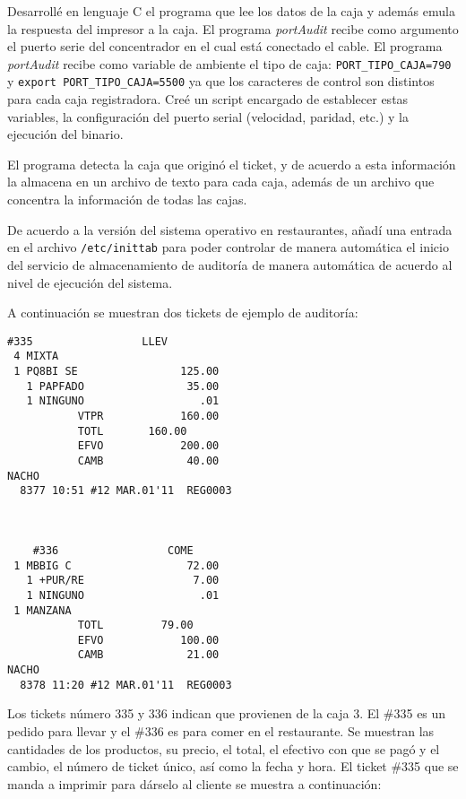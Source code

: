 Desarrollé en lenguaje C el programa que lee los datos de la caja y además emula la respuesta del impresor a la caja. El programa \textit{portAudit} recibe como argumento el puerto serie del concentrador en el cual está conectado el cable. El programa \textit{portAudit} recibe como variable de ambiente el tipo de caja: \texttt{PORT\_TIPO\_CAJA=790} y \texttt{export PORT\_TIPO\_CAJA=5500} ya que los caracteres de control son distintos para cada caja registradora. Creé un script encargado de establecer estas variables, la configuración del puerto serial (velocidad, paridad, etc.) y la ejecución del binario.

El programa detecta la caja que originó el ticket, y de acuerdo a esta información la almacena en un archivo de texto para cada caja, además de un archivo que concentra la información de todas las cajas.

De acuerdo a la versión del sistema operativo en restaurantes, añadí una entrada en el archivo \texttt{/etc/inittab} para poder controlar de manera automática el inicio del servicio de almacenamiento de auditoría de manera automática de acuerdo al nivel de ejecución del sistema. 

A continuación se muestran dos tickets de ejemplo de auditoría:

\begin{Verbatim}[fontsize=\small]
    #335                 LLEV  
 4 MIXTA   
 1 PQ8BI SE                125.00  
   1 PAPFADO                35.00  
   1 NINGUNO                  .01  
           VTPR            160.00  
           TOTL       160.00  
           EFVO            200.00  
           CAMB             40.00  
NACHO  
  8377 10:51 #12 MAR.01'11  REG0003  
 


    #336                 COME  
 1 MBBIG C                  72.00  
   1 +PUR/RE                 7.00  
   1 NINGUNO                  .01  
 1 MANZANA   
           TOTL         79.00  
           EFVO            100.00  
           CAMB             21.00  
NACHO  
  8378 11:20 #12 MAR.01'11  REG0003  
\end{Verbatim}

Los tickets número 335 y 336 indican que provienen de la caja 3. El \#335 es un pedido para llevar y el \#336 es para comer en el restaurante. Se muestran las cantidades de los productos, su precio, el total, el efectivo con que se pagó y el cambio, el número de ticket único, así como la fecha y hora. El ticket \#335 que se manda a imprimir para dárselo al cliente se muestra a continuación:

